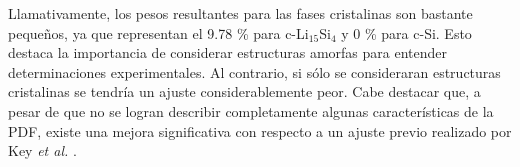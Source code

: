\begin{table}[h!]
    \centering
    \caption{Factor de peso de cada contribución (c-Si, c-Li$_{15}$Si$_4$, a-Si y 
    a-Li$_{15}$Si$_4$) a la función distribución radial de a pares $G(r)$ del 
    Si litiado (ver las Figuras \ref{fig:gofrs} y \ref{fig:pdfs} y la ecuación 
    \ref{eq:contributions}). El porcentaje que representa cada peso se agrega entre paréntesis.}
    \setlength\extrarowheight{2pt}
    \label{t:w-gofrs}
\end{table}
Llamativamente, los pesos resultantes para las fases cristalinas son bastante 
pequeños, ya que representan el 9.78 \% para c-Li$_{15}$Si$_4$ y 0 \% para c-Si.
Esto destaca la importancia de considerar estructuras amorfas para entender 
determinaciones experimentales. Al contrario, si sólo se consideraran estructuras
cristalinas se tendría un ajuste considerablemente peor. Cabe destacar que, a 
pesar de que no se logran describir completamente algunas características de la 
PDF, existe una mejora significativa con respecto a un ajuste previo realizado por 
Key \textit{et al.} \cite{key2011}.
